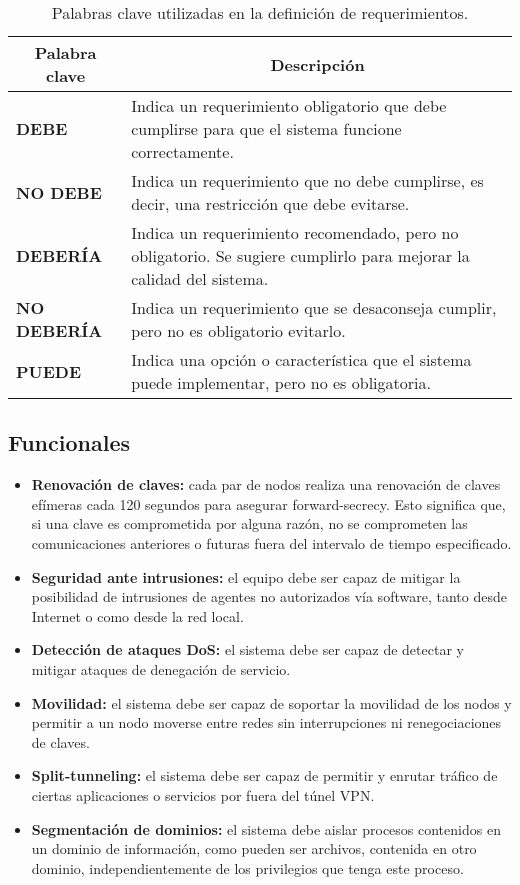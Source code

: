 \begin{table}[h!]
    \centering
    \begin{tabular}{|l|p{10cm}|}
        \hline
        \multicolumn{1}{|c|}{\textbf{Palabra clave}} & \multicolumn{1}{c|}{\textbf{Descripción}} \\
        \hline
        \textbf{DEBE} & Indica un requerimiento obligatorio que debe cumplirse para que el sistema funcione correctamente. \\
        \hline
        \textbf{NO DEBE} & Indica un requerimiento que no debe cumplirse, es decir, una restricción que debe evitarse. \\
        \hline
        \textbf{DEBERÍA} & Indica un requerimiento recomendado, pero no obligatorio. Se sugiere cumplirlo para mejorar la calidad del sistema. \\
        \hline
        \textbf{NO DEBERÍA} & Indica un requerimiento que se desaconseja cumplir, pero no es obligatorio evitarlo. \\
        \hline
        \textbf{PUEDE} & Indica una opción o característica que el sistema puede implementar, pero no es obligatoria. \\
        \hline
    \end{tabular}
    \caption{Palabras clave utilizadas en la definición de requerimientos.}
    \label{tab:palabras_clave_requerimientos}
\end{table}
\subsection{Funcionales}

\begin{itemize}
    \item \textbf{Renovación de claves:} cada par de nodos realiza una renovación de claves efímeras cada 120 segundos para asegurar forward-secrecy. Esto significa que, si una clave es comprometida por alguna razón, no se comprometen las comunicaciones anteriores o futuras fuera del intervalo de tiempo especificado.
    \item \textbf{Seguridad ante intrusiones:} el equipo debe ser capaz de  mitigar la posibilidad de intrusiones de agentes no autorizados vía software, tanto desde Internet o como desde la red local.
    \item \textbf{Detección de ataques DoS:} el sistema debe ser capaz de detectar y mitigar ataques de denegación de servicio.
    \item \textbf{Movilidad:} el sistema debe ser capaz de soportar la movilidad de los nodos y permitir a un nodo moverse entre redes sin interrupciones ni renegociaciones de claves. 
    \item \textbf{Split-tunneling:} el sistema debe ser capaz de permitir y enrutar tráfico de ciertas aplicaciones o servicios por fuera del túnel VPN. 
    \item \textbf{Segmentación de dominios: } el sistema debe aislar procesos contenidos en un dominio de información, como pueden ser archivos, contenida en otro dominio, independientemente de los privilegios que tenga este proceso.
\end{itemize}

